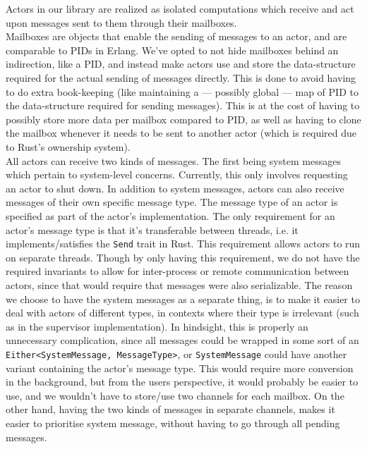 \documentclass[a4paper]{article}
\begin{document}
\noindent
Actors in our library are realized as isolated computations %
which receive and act upon messages sent to them through their mailboxes.\\

\noindent
Mailboxes are objects that enable the sending of messages to an actor, and are
comparable to PIDs in Erlang. We've opted to not hide mailboxes behind an
indirection, like a PID, and instead make actors use and store the
data-structure required for the actual sending of messages directly. This is done
to avoid having to do extra book-keeping (like maintaining a --- possibly global
--- map of PID to the data-structure required for sending messages). This is at
the cost of having to possibly store more data per mailbox compared to PID, as
well as having to clone the mailbox whenever it needs to be sent to another
actor (which is required due to Rust's ownership system).\\

\noindent
All actors can receive two kinds of messages. The first being system messages
which pertain to system-level concerns. Currently, this only involves requesting
an actor to shut down. In addition to system messages, actors can also
receive messages of their own specific message type. The message type of an
actor is specified as part of the actor's implementation. The only requirement
for an actor's message type is that it's transferable between threads, i.e. it
implements/satisfies the \texttt{Send} trait in Rust. This requirement allows
actors to run on separate threads. Though by only having this requirement, we do
not have the required invariants to allow for inter-process or remote
communication between actors, since that would require that messages were also
serializable. The reason we choose to have the system messages as a separate
thing, is to make it easier to deal with actors of different types, in contexts
where their type is irrelevant (such as in the supervisor implementation). In
hindsight, this is properly an unnecessary complication, since all messages
could be wrapped in some sort of an \texttt{Either<SystemMessage, MessageType>},
or \texttt{SystemMessage} could have another variant containing the actor's
message type. This would require more conversion in the background, but from the
users perspective, it would probably be easier to use, and we wouldn't have to
store/use two channels for each mailbox. On the other hand, having the two kinds
of messages in separate channels, makes it easier to prioritise system message,
without having to go through all pending messages.\\
\end{document}
